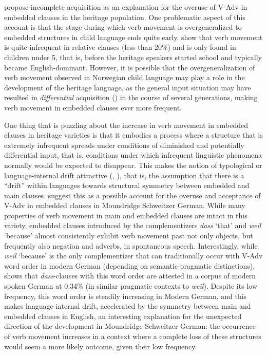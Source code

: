 \documentclass[output=paper]{langscibook}
\begin{document}
\citet{LarssonJohannessen2015Embedded,LarssonJohannessen2015Incomplete} propose incomplete acquisition as an explanation for the overuse of V-Adv in embedded clauses in the heritage population. One problematic aspect of this account is that the stage during which verb movement is overgeneralized to embedded structures in child language ends quite early. \citet{RingstadKush2021} show that verb movement is quite infrequent in relative clauses (less than 20\%) and is only found in children under 5, that is, before the heritage speakers started school and typically became English\hyp dominant. However, it is possible that the overgeneralization of verb movement observed in Norwegian child language may play a role in the development of the heritage language, as the general input situation may have resulted in \textit{differential} acquisition (\citealt{RothmanKupisch2018}) in the course of several generations, making verb movement in embedded clauses ever more frequent. 

One thing that is puzzling about the increase in verb movement in embedded clauses in heritage varieties is that it embodies a process where a structure that is extremely infrequent spreads under conditions of diminished and potentially differential input, that is, conditions under which infrequent linguistic phenomena normally would be expected to disappear. This makes the notion of typological or language-internal drift attractive (\citealt{HoppPutnam2015}, \citealt{JensbergEtAl2024}), that is, the assumption that there is a “drift” within languages towards structural symmetry between embedded and main clauses. \citet{HoppPutnam2015} suggest this as a possible account for the overuse and acceptance of V-Adv in embedded clauses in Moundridge Schweitzer German. While many properties of verb movement in main and embedded clauses are intact in this variety, embedded clauses introduced by the complementizers \textit{dass} `that' and \textit{weil} `because' almost consistently exhibit verb movement past not only objects, but frequently also negation and adverbs, in spontaneous speech. Interestingly, while \textit{weil} ‘because’ is the only complementizer that can traditionally occur with V-Adv word order in modern German (depending on semantic\hyp pragmatic distinctions), \citet{Freywald2008} shows that \textit{dass}{}-clauses with this word order are attested in a corpus of modern spoken German at 0.34\% (in similar pragmatic contexts to \textit{weil}). Despite its low frequency, this word order is steadily increasing in Modern German, and this makes language-internal drift, accelerated by the symmetry between main and embedded clauses in English, an interesting explanation for the unexpected direction of the development in Moundridge Schweitzer German: the occurrence of verb movement increases in a context where a complete loss of these structures would seem a more likely outcome, given their low frequency.
\end{document}
